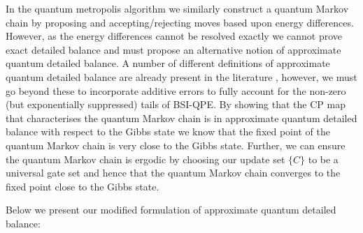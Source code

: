 \documentclass[aps,floatfix,10pt,amssymb,amsfont,amsmath,superscriptaddress,float,nofootinbib,longbibliography,nobalancelastpage,twocolumn]{revtex4-2}
\begin{document}
In the quantum metropolis algorithm we similarly construct a quantum Markov chain by proposing and accepting/rejecting moves based upon energy differences. However, as the energy differences cannot be resolved exactly we cannot prove exact detailed balance and must propose an alternative notion of approximate quantum detailed balance. A number of different definitions of approximate quantum detailed balance are already present in the literature \cite{}, however, we must go beyond these to incorporate additive errors to fully account for the non-zero (but exponentially suppressed) tails of BSI-QPE. By showing that the CP map that characterises the quantum Markov chain is in approximate quantum detailed balance with respect to the Gibbs state we know that the fixed point of the quantum Markov chain is very close to the Gibbs state. Further, we can ensure the quantum Markov chain is ergodic by choosing our update set $\{C\}$ to be a universal gate set \cite{Temme_2011} and hence that the quantum Markov chain converges to the fixed point close to the Gibbs state.

Below we present our modified formulation of approximate quantum detailed balance:
\end{document}
